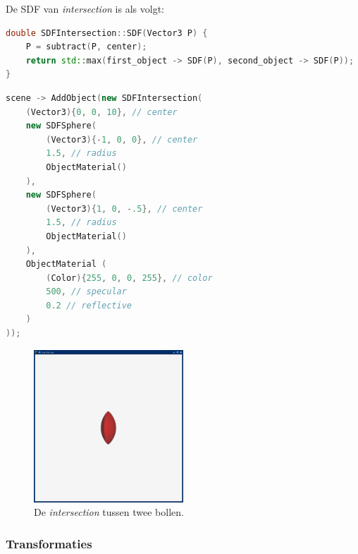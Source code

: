 \documentclass[12pt, a4paper]{article}
\begin{document}
De SDF van \emph{intersection} is als volgt:

\begin{lstlisting}[language=C++]
double SDFIntersection::SDF(Vector3 P) {
    P = subtract(P, center);
    return std::max(first_object -> SDF(P), second_object -> SDF(P));
}
\end{lstlisting}

\begin{lstlisting}[language=C++]
scene -> AddObject(new SDFIntersection(
    (Vector3){0, 0, 10}, // center
    new SDFSphere(
        (Vector3){-1, 0, 0}, // center
        1.5, // radius
        ObjectMaterial()
    ),
    new SDFSphere(
        (Vector3){1, 0, -.5}, // center
        1.5, // radius
        ObjectMaterial()
    ),
    ObjectMaterial (
        (Color){255, 0, 0, 255}, // color
        500, // specular
        0.2 // reflective
    )
));
\end{lstlisting}

\begin{figure}[h]
    \centering
    \includegraphics[width=0.50\textwidth]{renders/intersection.png}
    \caption{De \emph{intersection} tussen twee bollen.}
    \label{fig:intersection}
\end{figure}
\subsubsection{Transformaties}
\end{document}
